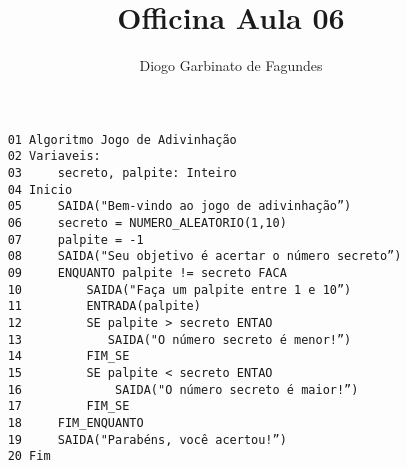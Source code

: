 \documentclass[11pt]{article}
\author{Diogo Garbinato de Fagundes}
\title{Officina Aula 06}
\begin{document}
\maketitle

\begin{verbatim}
    01 Algoritmo Jogo de Adivinhação
    02 Variaveis:
    03     secreto, palpite: Inteiro
    04 Inicio
    05     SAIDA("Bem-vindo ao jogo de adivinhação”)
    06     secreto = NUMERO_ALEATORIO(1,10)
    07     palpite = -1
    08     SAIDA("Seu objetivo é acertar o número secreto”)
    09     ENQUANTO palpite != secreto FACA
    10         SAIDA("Faça um palpite entre 1 e 10”)
    11         ENTRADA(palpite)
    12         SE palpite > secreto ENTAO
    13            SAIDA("O número secreto é menor!”)
    14         FIM_SE
    15         SE palpite < secreto ENTAO
    16             SAIDA("O número secreto é maior!”)
    17         FIM_SE
    18     FIM_ENQUANTO
    19     SAIDA("Parabéns, você acertou!”)
    20 Fim
\end{verbatim}
\end{document}
